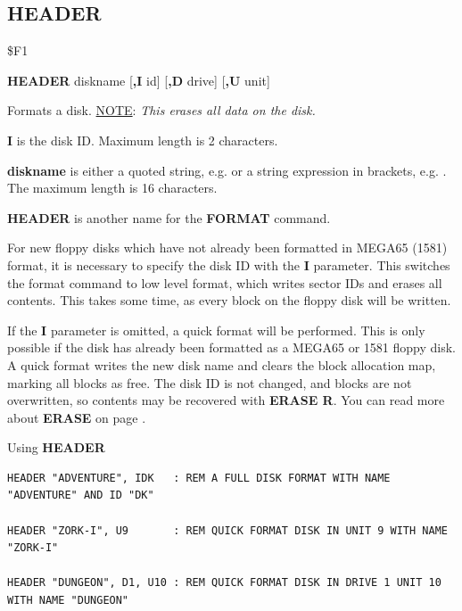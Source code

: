 \subsection{HEADER}
\begin{description}[leftmargin=2cm,style=nextline]
\item [Token:]    \$F1

\item [Format:]   {\bf HEADER} diskname [{\bf,I} id] [{\bf,D} drive] [{\bf,U} unit]

\item [Usage:]    Formats a disk. \underline{NOTE}: {\em This erases all data on the disk.}

                  {\bf I} is the disk ID. Maximum length is 2 characters.

                  {\bf diskname} is either a quoted string, e.g.  or a string expression in brackets, e.g. . The maximum length is 16 characters.

                  \drivedefinition

                  \unitdefinition

\item [Remarks:]  {\bf HEADER} is another name for the {\bf FORMAT} command.

                  For new floppy disks which have not already been formatted in MEGA65 (1581) format, it is necessary to specify the disk ID with the {\bf I} parameter. This switches the format command to low level format, which writes sector IDs and erases all contents. This takes some time, as every block on the floppy disk will be written.

                  If the {\bf I} parameter is omitted, a quick format will be performed. This is only possible if the disk has already been formatted as a MEGA65 or 1581 floppy disk. A quick format writes the new disk name and clears the block allocation map, marking all blocks as free. The disk ID is not changed, and blocks are not overwritten, so contents may be recovered with {\bf ERASE R}. You can read more about {\bf ERASE} on page \pageref{BASIC 65 Commands!ERASE}.

\item [Examples:] Using {\bf HEADER}

\begin{tcolorbox}[colback=black,coltext=white]
\verbatimfont{\codefont}
\begin{verbatim}
HEADER "ADVENTURE", IDK   : REM A FULL DISK FORMAT WITH NAME "ADVENTURE" AND ID "DK"

HEADER "ZORK-I", U9       : REM QUICK FORMAT DISK IN UNIT 9 WITH NAME "ZORK-I"

HEADER "DUNGEON", D1, U10 : REM QUICK FORMAT DISK IN DRIVE 1 UNIT 10 WITH NAME "DUNGEON"
\end{verbatim}
\end{tcolorbox}
\end{description}

